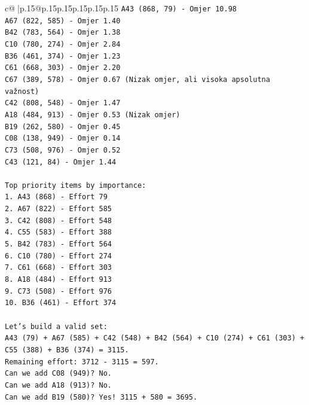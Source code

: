 \documentclass{article}
\begin{document}
{\begin{supertabular}{c@{$\;$}|p{.15\linewidth}@{}p{.15\linewidth}p{.15\linewidth}p{.15\linewidth}p{.15\linewidth}p{.15\linewidth}}
{{{\texttt{A43 (868, 79) {-} Omjer 10.98} \\
\texttt{A67 (822, 585) {-} Omjer 1.40} \\
\texttt{B42 (783, 564) {-} Omjer 1.38} \\
\texttt{C10 (780, 274) {-} Omjer 2.84} \\
\texttt{B36 (461, 374) {-} Omjer 1.23} \\
\texttt{C61 (668, 303) {-} Omjer 2.20} \\
\texttt{C67 (389, 578) {-} Omjer 0.67 (Nizak omjer, ali visoka apsolutna važnost)} \\
\texttt{C42 (808, 548) {-} Omjer 1.47} \\
\texttt{A18 (484, 913) {-} Omjer 0.53 (Nizak omjer)} \\
\texttt{B19 (262, 580) {-} Omjer 0.45} \\
\texttt{C08 (138, 949) {-} Omjer 0.14} \\
\texttt{C73 (508, 976) {-} Omjer 0.52} \\
\texttt{C43 (121, 84) {-} Omjer 1.44} \\
\\ 
\texttt{Top priority items by importance:} \\
\texttt{1. A43 (868) {-} Effort 79} \\
\texttt{2. A67 (822) {-} Effort 585} \\
\texttt{3. C42 (808) {-} Effort 548} \\
\texttt{4. C55 (583) {-} Effort 388} \\
\texttt{5. B42 (783) {-} Effort 564} \\
\texttt{6. C10 (780) {-} Effort 274} \\
\texttt{7. C61 (668) {-} Effort 303} \\
\texttt{8. A18 (484) {-} Effort 913} \\
\texttt{9. C73 (508) {-} Effort 976} \\
\texttt{10. B36 (461) {-} Effort 374} \\
\\ 
\texttt{Let's build a valid set:} \\
\texttt{A43 (79) + A67 (585) + C42 (548) + B42 (564) + C10 (274) + C61 (303) + C55 (388) + B36 (374) = 3115.} \\
\texttt{Remaining effort: 3712 {-} 3115 = 597.} \\
\texttt{Can we add C08 (949)? No.} \\
\texttt{Can we add A18 (913)? No.} \\
\texttt{Can we add B19 (580)? Yes! 3115 + 580 = 3695.} \\
}}}
\end{supertabular}}
\end{document}
